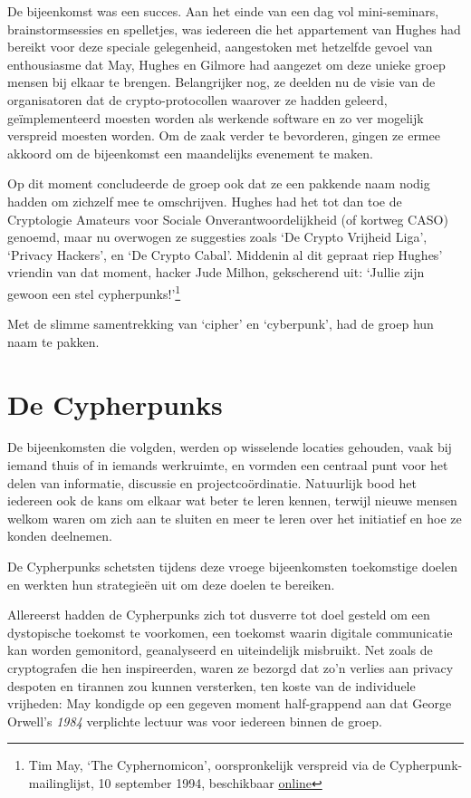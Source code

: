 \documentclass[smalldemyvopaper,11pt,twoside,onecolumn,openright,extrafontsizes,hidelinks]{memoir}
\begin{document}
De bijeenkomst was een succes. Aan het einde van een dag vol
mini-seminars, brainstormsessies en spelletjes, was iedereen die het
appartement van Hughes had bereikt voor deze speciale gelegenheid,
aangestoken met hetzelfde gevoel van enthousiasme dat May, Hughes en
Gilmore had aangezet om deze unieke groep mensen bij elkaar te brengen.
Belangrijker nog, ze deelden nu de visie van de organisatoren dat de
crypto-protocollen waarover ze hadden geleerd, geïmplementeerd moesten
worden als werkende software en zo ver mogelijk verspreid moesten
worden. Om de zaak verder te bevorderen, gingen ze ermee akkoord om de
bijeenkomst een maandelijks evenement te maken.

Op dit moment concludeerde de groep ook dat ze een pakkende naam nodig
hadden om zichzelf mee te omschrijven. Hughes had het tot dan toe de
Cryptologie Amateurs voor Sociale Onverantwoordelijkheid (of kortweg
CASO) genoemd, maar nu overwogen ze suggesties zoals `De Crypto Vrijheid
Liga', `Privacy Hackers', en `De Crypto Cabal'. Middenin al dit gepraat
riep Hughes' vriendin van dat moment, hacker Jude Milhon, gekscherend
uit: `Jullie zijn gewoon een stel cypherpunks!'\footnote{Tim May, `The
  Cyphernomicon', oorspronkelijk verspreid via de
  Cypherpunk-mailinglijst, 10 september 1994, beschikbaar
  \href{https://cdn.nakamotoinstitute.org/docs/cyphernomicon.txt}{online}}

Met de slimme samentrekking van `cipher' en `cyberpunk', had de groep
hun naam te pakken.

\section{De Cypherpunks}\label{de-cypherpunks}

De bijeenkomsten die volgden, werden op wisselende locaties gehouden,
vaak bij iemand thuis of in iemands werkruimte, en vormden een centraal
punt voor het delen van informatie, discussie en projectcoördinatie.
Natuurlijk bood het iedereen ook de kans om elkaar wat beter te leren
kennen, terwijl nieuwe mensen welkom waren om zich aan te sluiten en
meer te leren over het initiatief en hoe ze konden deelnemen.

De Cypherpunks schetsten tijdens deze vroege bijeenkomsten toekomstige
doelen en werkten hun strategieën uit om deze doelen te bereiken.

Allereerst hadden de Cypherpunks zich tot dusverre tot doel gesteld om
een dystopische toekomst te voorkomen, een toekomst waarin digitale
communicatie kan worden gemonitord, geanalyseerd en uiteindelijk
misbruikt. Net zoals de cryptografen die hen inspireerden, waren ze
bezorgd dat zo'n verlies aan privacy despoten en tirannen zou kunnen
versterken, ten koste van de individuele vrijheden: May kondigde op een
gegeven moment half-grappend aan dat George Orwell's \emph{1984}
verplichte lectuur was voor iedereen binnen de groep.
\end{document}
